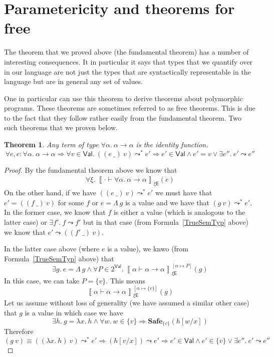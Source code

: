 \documentclass{article}
\newtheorem{theorem}{Theorem}
\newcommand{\EXP}{\mathsf{E}}
\newcommand{\VAL}{\mathsf{Val}}
\newcommand{\semtyp}[3]{\left\llbracket #2 \vdash #3 \right\rrbracket_{#1}}
\newcommand{\semenv}{\xi}
\newcommand{\TArg}{\_}
\newcommand{\TLam}{\Lambda}
\newcommand{\expr}{e}
\newcommand{\exprB}{f}
\newcommand{\exprC}{g}
\newcommand{\exprD}{h}
\newcommand{\val}{v}
\newcommand{\valB}{w}
\newcommand{\var}{x}
\newcommand{\tvar}{\alpha}
\newcommand{\step}{\leadsto}
\newcommand{\steps}{\leadsto^*}
\begin{document}
\section{Parametericity and theorems for free}
The theorem that we proved above (the fundamental theorem)
has a number of interesting consequences.
It in particular it says that types that we quantify over in our
language are not just the types that are syntactically
representable in the language but are in general any set of
values.

One in particular can use this theorem to derive theorems about
polymorphic programs.
These theorems are sometimes referred to as free theorems. This is due to the fact that they follow rather easily from the
fundamental theorem.
Two such theorems that we proven below.

\begin{theorem}
Any term of type $\forall \tvar.~\tvar \to \tvar$ is the identity function.
\[
\forall \expr, \expr : \forall \tvar.~\tvar \to \tvar \Rightarrow
\forall \val \in \VAL.~((\expr~\TArg)~\val) \steps \expr' \Rightarrow
\expr' \in \VAL \land \expr' = v \lor \exists \expr''.~\expr' \step \expr''
\]
\end{theorem}

\begin{proof}
By the fundamental theorem above we know that
\begin{align}
\forall \semenv.~ \semtyp{\semenv\EXP}{\cdot}{\forall \tvar.~\tvar \to \tvar}(\expr)
\label{TrueSemTyp}
\end{align}
On the other hand, if we have $((\expr~\TArg)~\val) \steps \expr'$ we must have
that $\expr' = ((\exprB~\TArg)~\val)$ for some $\exprB$ or $\expr = \TLam~\exprC$ is a value and
we have that $(\exprC~\val) \steps \expr'$.
In the former case, we know that $f$ is either a value (which is analogous to the latter case) or $\exists \exprB'.~\exprB \step \exprB'$ but in that
case (from Formula~\ref{TrueSemTyp} above) we know that
$\expr' \step ((\exprB'~\TArg)~\val)$.

In the latter case above (where $e$ is a value), we knwo
(from Formula~\ref{TrueSemTyp} above) that
\[
\exists \exprC.~\expr = \TLam~\exprC \land
\forall P\in 2^{\VAL}.~\semtyp{\semenv\EXP}{\tvar}{\tvar \to \tvar}^{[\tvar \mapsto P]}(\exprC)
\]
In this case, we can take $P = \{v\}$. This means
\[
\semtyp{\semenv\EXP}{\tvar}{\tvar \to \tvar}^{[\tvar \mapsto \{v\}]}(\exprC)
\]
Let us assume without loss of generality (we have assumed a similar other case) that $\exprC$ is a value in which case we have
\[
\exists \exprD.~ \exprC = \lambda \var.~\exprD \land \forall \valB.~ \valB \in \{\val\}
\Rightarrow \mathbf{Safe}_{\{\val\}}(\exprD[\valB/\var])
\]
Therefore
\[
(\exprC~v) \equiv ((\lambda \var.~\exprD)~\val) \steps \expr' \Rightarrow
(\exprD[\val/\var]) \step \expr' \Rightarrow
\expr' \in \VAL \land \expr' \in \{\val\} \lor \exists \expr''.~\expr' \step \expr''
\]
\end{proof}
\end{document}
